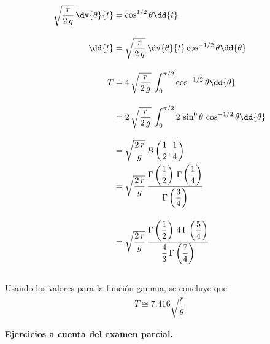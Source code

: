 \begin{align*}
\sqrt{\dfrac{r}{2 \, g}} \, \dv{\theta}{t} &= \cos^{1/2} \theta
\dd{t} \\[1em]
\dd{t} &= \sqrt{\dfrac{r}{2 \, g}} \, \dv{\theta}{t} \cos^{-1/2} \theta \dd{\theta} \\[1em]
T &= 4 \, \sqrt{\dfrac{r}{2 \, g}} \, \int_{0}^{\pi/2} \cos^{-1/2} \theta \dd{\theta} \\[1em]
&= 2 \, \sqrt{\dfrac{r}{2 \, g}} \, \int_{0}^{\pi/2} 2 \, \sin^{0} \theta \, \cos^{-1/2} \theta \dd{\theta} \\[1em]
&= \sqrt{\dfrac{2 \, r}{g}} \, B \left( \dfrac{1}{2}, \dfrac{1}{4} \right) \\
&= \sqrt{\dfrac{2 \, r}{g}} \, \dfrac{\Gamma \left(\dfrac{1}{2} \right) \, \Gamma \left(\dfrac{1}{4} \right)}{\Gamma \left(\dfrac{3}{4} \right)} \\[1em]
&= \sqrt{\dfrac{2 \, r}{g}} \, \dfrac{\Gamma \left(\dfrac{1}{2} \right) \, 4 \, \Gamma \left(\dfrac{5}{4} \right)}{\dfrac{4}{3} \, \Gamma \left(\dfrac{7}{4} \right)} \\[1em]
\end{align*}

Usando los valores para la función gamma, se concluye que
\begin{align*}
T \cong 7.416 \sqrt{\dfrac{r}{g}}
\end{align*}

\newpage
\textbf{Ejercicios a cuenta del examen parcial.}

